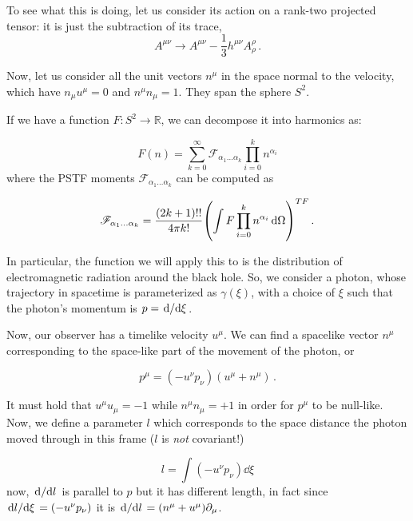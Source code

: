 \documentclass[main.tex]{subfiles}
\begin{document}
To see what this is doing, let us consider its action on a rank-two projected tensor: it is just the subtraction of its trace,
\begin{equation}
    A^{\mu\nu} \rightarrow A^{\mu\nu} - \frac{1}{3} h^{\mu\nu} A^{\rho}_\rho \,.
\end{equation}

Now, let us consider all the unit vectors \(n^\mu\) in the space normal to the velocity, which have \(n_\mu u^\mu = 0\) and \(n^\mu n_\mu = 1\). They span the sphere \(S^2\).

If we have a function \(F\colon S^2 \rightarrow \mathbb R\), we can decompose it into harmonics as:

\begin{equation}
    F(n) = \sum _{k=0}   ^{\infty}
    \mathscr F_{\alpha_1 \dots \alpha_k} \prod_{i=0}^k n^{\alpha_i}
\end{equation}
where the PSTF moments \(\mathscr F_{\alpha_1 \dots \alpha_k}\) can be computed as

\begin{equation} \label{eq:PSTF-moments-function-decomposition}
    \mathscr F_{\alpha_1 \dots \alpha_k} =
    \frac{(2k+1)!!}{4 \pi k!} \qty(\int F \prod_{i=0}^k n^{\alpha_i}  \dd{\Omega}  )^{TF} \,.
\end{equation}

In particular, the function we will apply this to is the distribution of electromagnetic radiation around the black hole. So, we consider a photon, whose trajectory in spacetime is parameterized as \(\gamma(\xi)\), with a choice of \(\xi\) such that the photon's momentum is
\(
p = \dv*{}{\xi}
\).

Now, our observer has a timelike velocity \(u^\mu\). We can find a spacelike vector \(n^\mu\) corresponding to the space-like part of the movement of the photon, or

\begin{equation}
  p^\mu = (- u^\nu p_\nu) (u^\mu + n^\mu)\,.
\end{equation}

It must hold that \(u^\mu u_\mu = -1 \) while \(n^\mu n_\mu = +1 \) in order for \(p^\mu\) to be null-like.
Now, we define a parameter \(l\) which corresponds to the space distance the photon moved through in this frame (\(l\)  is \emph{not} covariant!)

\begin{equation}
    l = \int  (-u^\nu p_\nu) \dd{\xi}
\end{equation}
now, \(\dv*{}{l} \) is parallel to \(p\) but it has different length, in fact since \(\dv*{l}{\xi} = (-u^\nu p_\nu) \) it is \(\dv*{}{l} = (n^\mu + u^\mu) \partial_\mu\).
\end{document}
